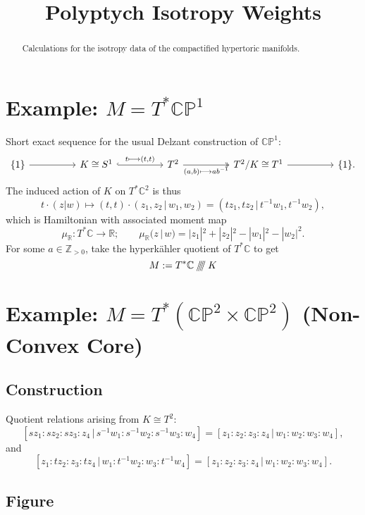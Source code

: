 \documentclass{article}
\title{Polyptych Isotropy Weights}
\date{}	%
\newcommand{\lra}{\longrightarrow}
\newcommand{\HK}{hyperk\"ahler }
\newcommand{\PP}{\mathbb{P}}
\newcommand{\RR}{\mathbb{R}}
\newcommand{\CC}{\mathbb{C}}
\newcommand{\ZZ}{\mathbb{Z}}
\newcommand{\sssslash}{\mathbin{/\mkern-6mu/\mkern-6mu/\mkern-6mu/}}
\begin{document}
	\maketitle
	
	\begin{abstract}
		Calculations for the isotropy data of the compactified hypertoric manifolds.
	\end{abstract}
	
	\section{Example: $M = T^{\ast}\CC\PP^{1}$}
	
	Short exact sequence for the usual Delzant construction of $\CC\PP^{1}$:
	\[
		\begin{tikzcd}
				\{1\} \arrow[rr] &  & K \cong S^{1} \arrow[rr, "{t \longmapsto (t,t)}", hook] &  & T^{2} \arrow[rr, "{(a,b) \longmapsto ab^{-1}}"', two heads] &  & T^{2}/K \cong T^{1} \arrow[rr] &  & \{1\}.
		\end{tikzcd}
	\]
	The induced action of $K$ on $T^{\ast}\CC^{2}$ is thus
	\[
		t \cdot (z|w) \longmapsto (t, t) \cdot (z_{1}, z_{2}\, |\, w_{1}, w_{2}) = (t z_{1}, t z_{2}\, |\, t^{-1} w_{1}, t^{-1} w_{2}),
	\]
	which is Hamiltonian with associated moment map
	\[
		\mu_{\RR} : T^{\ast}\CC \lra \RR; \qquad  \mu_{\RR}(z\, |\, w) = |z_{1}|^{2} + |z_{2}|^{2} - |w_{1}|^{2} - |w_{2}|^{2}.
	\]
	For some $a \in \ZZ_{>0}$, take the \HK quotient of $T^{\ast}\CC$ to get
	\[
		M := T^{\ast}\CC \sssslash K
	\]

	\section{Example: $M = T^{\ast}(\CC\PP^{2} \times \CC\PP^{2})$ (Non-Convex Core)}
	
	\subsection{Construction}
	
	Quotient relations arising from $K \cong T^{2}$:
	\[
		[sz_{1} : sz_{2} : sz_{3} : z_{4} \, | \, s^{-1}w_{1} : s^{-1}w_{2} : s^{-1}w_{3} : w_{4}] = [z_{1} : z_{2} : z_{3} : z_{4} \, | \, w_{1} : w_{2} : w_{3} : w_{4} ],
	\]
	and
	\[
		[z_{1} : tz_{2} : z_{3} : tz_{4} \, | \, w_{1} : t^{-1}w_{2} : w_{3} : t^{-1}w_{4}] = [z_{1} : z_{2} : z_{3} : z_{4} \, | \, w_{1} : w_{2} : w_{3} : w_{4} ].
	\]
	
	\subsection{Figure}
	
\end{document}
